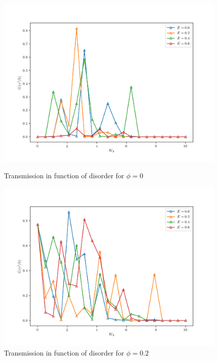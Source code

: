 \documentclass[12pt]{article}
\numberwithin{equation}{section}
\begin{document}
\newpage
\begin{figure}
  \centering
  \begin{minipage}{0.49\textwidth}
    \centering
    \includegraphics[width=1.0\textwidth]{./media/transmission_square_lat_phi=0dot0.png} %
    \caption{Transmission in function of disorder for $\phi=0$}
  \end{minipage}\hfill
  \begin{minipage}{0.49\textwidth}
      \centering
      \includegraphics[width=1.0\textwidth]{./media/transmission_square_lat_phi=0dot2.png} %
      \caption{Transmission in function of disorder for $\phi=0.2$}
  \end{minipage}
\end{figure}
\end{document}
